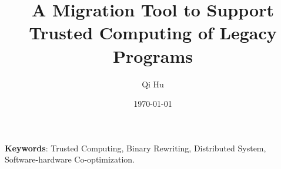 \documentclass[a4paper,11pt]{article}
\title{A Migration Tool to Support Trusted Computing of Legacy Programs}
\author{Qi Hu}
\date{\today}
\newcommand\keywords[1]{\textbf{Keywords}: #1}
\begin{document}
  \maketitle%
  \keywords{Trusted Computing, Binary Rewriting, Distributed System, Software-hardware Co-optimization.}

  
  
  
  
  
  

  
  
\end{document}

